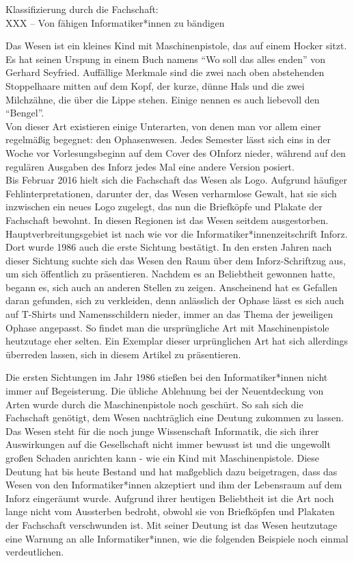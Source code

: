 {Klassifizierung durch die Fachschaft:\\
XXX – Von fähigen Informatiker*innen zu bändigen}
{Das Wesen ist ein kleines Kind mit Maschinenpistole, das auf einem Hocker sitzt. Es hat seinen Urspung in einem Buch namens "`Wo soll das alles enden"' von Gerhard Seyfried. Auffällige Merkmale sind die zwei nach oben abstehenden Stoppelhaare mitten auf dem Kopf, der kurze, dünne Hals und die zwei Milchzähne, die über die Lippe stehen. Einige nennen es auch liebevoll den "`Bengel"'.\\

Von dieser Art existieren einige Unterarten, von denen man vor allem einer regelmäßig begegnet: den Ophasenwesen. Jedes Semester lässt sich eins in der Woche vor Vorlesungsbeginn auf dem Cover des OInforz nieder, während auf den regulären Ausgaben des Inforz jedes Mal eine andere Version posiert.\\

Bis Februar 2016 hielt sich die Fachschaft das Wesen als Logo. Aufgrund häufiger Fehlinterpretationen, darunter der, das Wesen verharmlose Gewalt, hat sie sich inzwischen ein neues Logo zugelegt, das nun die Briefköpfe und Plakate der Fachschaft bewohnt. In diesen Regionen ist das Wesen seitdem ausgestorben.\\

Hauptverbreitungsgebiet ist nach wie vor die Informatiker*innenzeitschrift Inforz. Dort wurde 1986 auch die erste Sichtung bestätigt. In den ersten Jahren nach dieser Sichtung suchte sich das Wesen den Raum über dem Inforz-Schriftzug aus, um sich öffentlich zu präsentieren. Nachdem es an Beliebtheit gewonnen hatte, begann es, sich auch an anderen Stellen zu zeigen. Anscheinend hat es Gefallen daran gefunden, sich zu verkleiden, denn anlässlich der Ophase lässt es sich auch auf T-Shirts und Namensschildern nieder, immer an das Thema der jeweiligen Ophase angepasst. So findet man die ursprüngliche Art mit Maschinenpistole heutzutage eher selten. Ein Exemplar dieser urprünglichen Art hat sich allerdings überreden lassen, sich in diesem Artikel zu präsentieren.

Die ersten Sichtungen im Jahr 1986 stießen bei den Informatiker*innen nicht immer auf Begeisterung. Die übliche Ablehnung bei der Neuentdeckung von Arten wurde durch die Maschinenpistole noch geschürt. So sah sich die Fachschaft genötigt, dem Wesen nachträglich eine Deutung zukommen zu lassen. Das Wesen steht für die noch junge Wissenschaft Informatik, die sich ihrer Auswirkungen auf die Gesellschaft nicht immer bewusst ist und die ungewollt großen Schaden anrichten kann - wie ein Kind mit Maschinenpistole. Diese Deutung hat bis heute Bestand und hat maßgeblich dazu beigetragen, dass das Wesen von den Informatiker*innen akzeptiert und ihm der Lebensraum auf dem Inforz eingeräumt wurde.
Aufgrund ihrer heutigen Beliebtheit ist die Art noch lange nicht vom Aussterben bedroht, obwohl sie von Briefköpfen und Plakaten der Fachschaft verschwunden ist.
Mit seiner Deutung ist das Wesen heutzutage eine Warnung an alle Informatiker*innen, wie die folgenden Beispiele noch einmal verdeutlichen.

}
